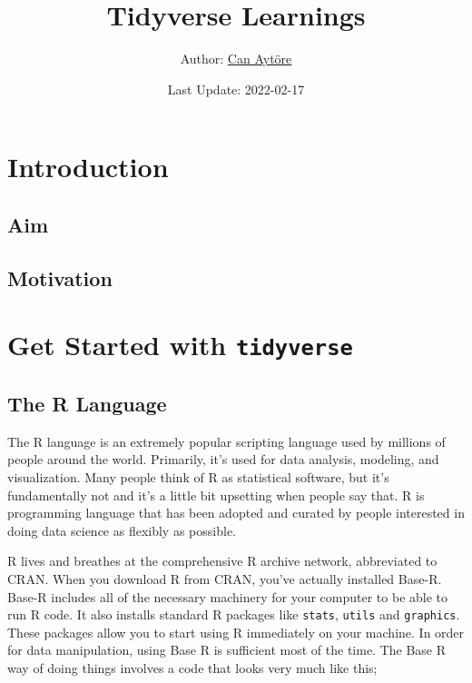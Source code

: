\documentclass[
]{article}
\title{Tidyverse Learnings}
\author{Author: \href{https://github.com/canaytore/}{Can Aytöre}}
\date{Last Update: 2022-02-17}
\begin{document}
\maketitle

{
\setcounter{tocdepth}{2}
\tableofcontents
}
\hypertarget{introduction}{%
\section{Introduction}\label{introduction}}

\hypertarget{aim}{%
\subsection{Aim}\label{aim}}

\hypertarget{motivation}{%
\subsection{Motivation}\label{motivation}}

\hypertarget{get-started-with-tidyverse}{%
\section{\texorpdfstring{Get Started with \texttt{tidyverse}}{Get Started with tidyverse}}\label{get-started-with-tidyverse}}

\hypertarget{the-r-language}{%
\subsection{The R Language}\label{the-r-language}}

The R language is an extremely popular scripting language used by millions of people around the world. Primarily, it's used for data analysis, modeling, and visualization. Many people think of R as statistical software, but it's fundamentally not and it's a little bit upsetting when people say that. R is programming language that has been adopted and curated by people interested in doing data science as flexibly as possible.

R lives and breathes at the comprehensive R archive network, abbreviated to CRAN. When you download R from CRAN, you've actually installed Base-R. Base-R includes all of the necessary machinery for your computer to be able to run R code. It also installs standard R packages like \texttt{stats}, \texttt{utils} and \texttt{graphics}. These packages allow you to start using R immediately on your machine. In order for data manipulation, using Base R is sufficient most of the time. The Base R way of doing things involves a code that looks very much like this;
\end{document}
